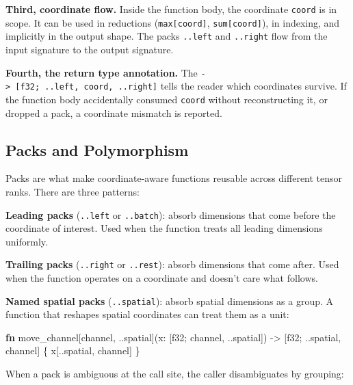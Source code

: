 \documentclass[11pt,titlepage]{article}
\newenvironment{Shaded}{}{}
\newcommand{\DataTypeTok}[1]{\textcolor[rgb]{0.56,0.13,0.00}{#1}}
\newcommand{\KeywordTok}[1]{\textcolor[rgb]{0.00,0.44,0.13}{\textbf{#1}}}
\newcommand{\NormalTok}[1]{#1}
\newcommand{\OperatorTok}[1]{\textcolor[rgb]{0.40,0.40,0.40}{#1}}
\begin{document}
\textbf{Third, coordinate flow.} Inside the function body, the
coordinate \texttt{coord} is in scope. It can be used in reductions
(\texttt{max{[}coord{]}}, \texttt{sum{[}coord{]}}), in indexing, and
implicitly in the output shape. The packs \texttt{..left} and
\texttt{..right} flow from the input signature to the output signature.

\textbf{Fourth, the return type annotation.} The
\texttt{-\textgreater{}\ {[}f32;\ ..left,\ coord,\ ..right{]}} tells the
reader which coordinates survive. If the function body accidentally
consumed \texttt{coord} without reconstructing it, or dropped a pack, a
coordinate mismatch is reported.

\vspace{2em}

\hypertarget{packs-and-polymorphism}{%
\subsection{Packs and Polymorphism}\label{packs-and-polymorphism}}

Packs are what make coordinate-aware functions reusable across different
tensor ranks. There are three patterns:

\textbf{Leading packs} (\texttt{..left} or \texttt{..batch}): absorb
dimensions that come before the coordinate of interest. Used when the
function treats all leading dimensions uniformly.

\textbf{Trailing packs} (\texttt{..right} or \texttt{..rest}): absorb
dimensions that come after. Used when the function operates on a
coordinate and doesn't care what follows.

\textbf{Named spatial packs} (\texttt{..spatial}): absorb spatial
dimensions as a group. A function that reshapes spatial coordinates can
treat them as a unit:

\begin{Shaded}
\begin{Highlighting}[]
\KeywordTok{fn}\NormalTok{ move_channel[channel, ..spatial](x: }\OperatorTok{[}\DataTypeTok{f32}\NormalTok{; channel, ..spatial}\OperatorTok{]}\NormalTok{)}
\NormalTok{    -> }\OperatorTok{[}\DataTypeTok{f32}\NormalTok{; ..spatial, channel}\OperatorTok{]}
\OperatorTok{\{}
\NormalTok{    x}\OperatorTok{[}\NormalTok{..spatial, channel}\OperatorTok{]}
\OperatorTok{\}}
\end{Highlighting}
\end{Shaded}

When a pack is ambiguous at the call site, the caller disambiguates by
grouping:
\end{document}
